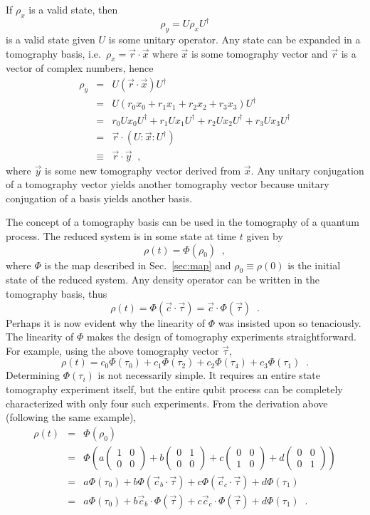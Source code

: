 If $\rho_x$ is a valid state, then 
$$
\rho_y = U\rho_x U^\dagger
$$
is a valid state given $U$ is some unitary operator.  Any state can be expanded in a tomography basis, i.e.\ $\rho_x=\vec{r}\cdot\vec{x}$ where $\vec{x}$ is some tomography vector and $\vec{r}$ is a vector of complex numbers, hence
\begin{eqnarray*}
\rho_y &=& U\left(\vec{r}\cdot\vec{x}\right)U^\dagger\\
&=& U\left( r_0x_0+r_1x_1+r_2x_2+r_3x_3\right)U^\dagger\\
&=& r_0Ux_0U^\dagger+r_1Ux_1U^\dagger+r_2Ux_2U^\dagger+r_3Ux_3U^\dagger\\
&=& \vec{r}\cdot \left(U:\vec{x}:U^\dagger\right)\\
&\equiv& \vec{r}\cdot\vec{y}\;\;,
\end{eqnarray*}
where $\vec{y}$ is some new tomography vector derived from $\vec{x}$.  Any unitary conjugation of a tomography vector yields another tomography vector because unitary conjugation of a basis yields another basis.  

The concept of a tomography basis can be used in the tomography of a quantum process.  The reduced system is in some state at time $t$ given by
$$
\rho(t) = \Phi(\rho_0)\;\;,
$$
where $\Phi$ is the map described in Sec.\ \ref{sec:map} and $\rho_0\equiv\rho(0)$ is the initial state of the reduced system.  Any density operator can be written in the tomography basis, thus
$$
\rho(t) = \Phi(\vec{c}\cdot\vec{\tau}) = \vec{c}\cdot\Phi(\vec{\tau})\;\;.
$$
Perhaps it is now evident why the linearity of $\Phi$ was insisted upon so tenaciously.  The linearity of $\Phi$ makes the design of tomography experiments straightforward.  For example, using the above tomography vector $\vec{\tau}$,
$$
\rho(t) = c_0\Phi(\tau_0)+c_1\Phi(\tau_2)+c_2\Phi(\tau_4)+c_3\Phi(\tau_1)\;\;.
$$
Determining $\Phi(\tau_i)$ is not necessarily simple.  It requires an entire state tomography experiment itself, but the entire qubit process can be completely characterized with only four such experiments.  From the derivation above (following the same example),
\begin{eqnarray*}
\rho(t) &=& \Phi(\rho_0)\\
&=& \Phi\left(a\begin{pmatrix}
1 & 0\\
0 & 0
\end{pmatrix}+b\begin{pmatrix}
0 & 1\\
0 & 0
\end{pmatrix}+c\begin{pmatrix}
0 & 0\\
1 & 0
\end{pmatrix}+d\begin{pmatrix}
0 & 0\\
0 & 1
\end{pmatrix}\right)\\
&=& a\Phi(\tau_0) + b\Phi(\vec{c}_b\cdot\vec{\tau}) + c\Phi(\vec{c}_c\cdot\vec{\tau}) + d\Phi(\tau_1)\\
&=& a\Phi(\tau_0) + b\vec{c}_b\cdot\Phi(\vec{\tau}) + c\vec{c}_c\cdot\Phi(\vec{\tau}) + d\Phi(\tau_1)\;\;.
\end{eqnarray*}

